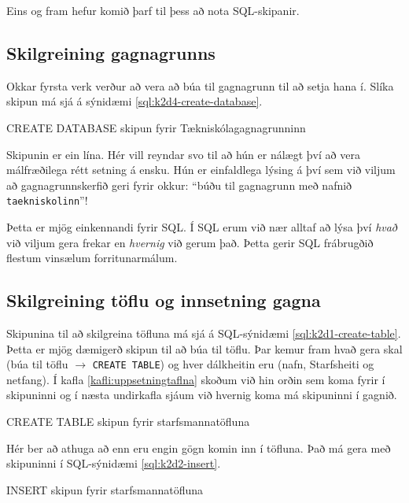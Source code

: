 Eins og fram hefur komið þarf til þess að nota SQL-skipanir. 

\subsection{Skilgreining gagnagrunns}
Okkar fyrsta verk verður að vera að búa til gagnagrunn til að setja hana í. Slíka skipun má sjá á sýnidæmi \ref{sql:k2d4-create-database}.

\begin{example}
\caption{CREATE DATABASE skipun fyrir Tækniskólagagnagrunninn}
\label{sql:k2d4-create-database}
\centering
{}
\end{example}

Skipunin er ein lína. Hér vill reyndar svo til að hún er nálægt því að vera málfræðilega rétt setning á ensku. Hún er einfaldlega lýsing á því sem við viljum að gagnagrunnskerfið geri fyrir okkur: ``búðu til gagnagrunn með nafnið \verb|taekniskolinn|''!

Þetta er mjög einkennandi fyrir SQL. Í SQL erum við nær alltaf að lýsa því \emph{hvað} við viljum gera frekar en \emph{hvernig} við gerum það. Þetta gerir SQL frábrugðið flestum vinsælum forritunarmálum.

\subsection{Skilgreining töflu og innsetning gagna}
Skipunina til að skilgreina töfluna má sjá á SQL-sýnidæmi \ref{sql:k2d1-create-table}. Þetta er mjög dæmigerð skipun til að búa til töflu. Þar kemur fram hvað gera skal (búa til töflu $\rightarrow$ \verb|CREATE TABLE|) og hver dálkheitin eru (nafn, Starfsheiti og netfang). Í kafla \ref{kafli:uppsetningtaflna} skoðum við hin orðin sem koma fyrir í skipuninni og í næsta undirkafla sjáum við hvernig koma má skipuninni í gagnið.

\begin{example}[h]
\caption{CREATE TABLE skipun fyrir starfsmannatöfluna}
\label{sql:k2d1-create-table}
\centering
{}
\end{example}

Hér ber að athuga að enn eru engin gögn komin inn í töfluna. Það má gera með skipuninni í SQL-sýnidæmi \ref{sql:k2d2-insert}.

\begin{example}[h]
\caption{INSERT skipun fyrir starfsmannatöfluna}
\label{sql:k2d2-insert}
\centering
{\small
{}
}
\end{example}

